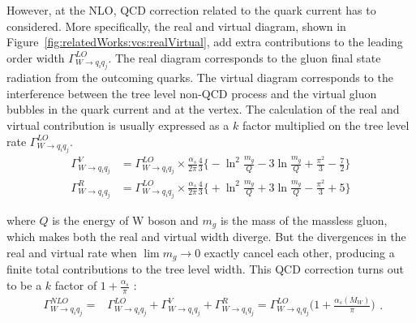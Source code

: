\noindent However, at the NLO, QCD correction related to the quark current has to considered. More specifically, the real and virtual diagram, shown in Figure~\ref{fig:relatedWorks:vcs:realVirtual}, add extra contributions to the leading order width $\Gamma_{W \to q_i q_j}^{LO} $. The real diagram corresponds to the gluon final state radiation from the outcoming quarks. The virtual diagram corresponds to the interference between the tree level non-QCD process and the virtual gluon bubbles in the quark current and at the vertex. The calculation of the real and virtual contribution is usually expressed as a $k$ factor multiplied on the tree level rate  $\Gamma_{W \to q_i q_j}^{LO} $.
 \begin{align}
 	\Gamma^V_{W \to q_i q_j}  &= \Gamma_{W \to q_i q_j}^{LO} \times \frac{\alpha_s}{2\pi}\frac{4}{3} \bigg \{  -\ln^2\frac{m_g}{Q} -3 \ln\frac{m_g}{Q} + \frac{\pi^2}{3}-\frac{7}{2} \bigg\} \\
    \Gamma^R_{W \to q_i q_j}  &= \Gamma_{W \to q_i q_j}^{LO} \times \frac{\alpha_s}{2\pi}\frac{4}{3} \bigg \{  +\ln^2\frac{m_g}{Q} + 3 \ln\frac{m_g}{Q} - \frac{\pi^2}{3}+ 5 \bigg\}
\end{align}
 
\noindent  where $Q$ is the energy of W boson and $m_g$ is the mass of the massless gluon, which makes both the real and virtual width diverge. But the divergences in the real and virtual rate when $\lim m_g \to 0$ exactly cancel each other, producing a finite total contributions to the tree level width. This QCD correction turns out to be a $k$ factor of $1+\frac{\alpha_s}{\pi}$ :
\begin{equation}
\begin{split}
    \Gamma_{W \to q_i q_j}^{NLO} =& \Gamma_{W \to q_i q_j}^{LO} + \Gamma^{V}_{W \to q_i q_j}  + \Gamma^{R}_{W \to q_i q_j}
            =   \Gamma_{W \to q_i q_j}^{LO} \big( 1+ \frac{\alpha_s(M_W)}{\pi}\big)
\end{split} .
\end{equation}

